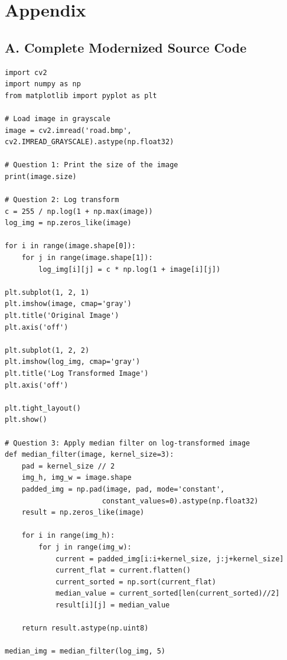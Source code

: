 \documentclass[12pt,a4paper]{article}
\begin{document}
\newpage
\section*{Appendix}

\subsection*{A. Complete Modernized Source Code}
{}

\begin{lstlisting}[caption={Complete Modernized Python Implementation}]
import cv2
import numpy as np
from matplotlib import pyplot as plt

# Load image in grayscale
image = cv2.imread('road.bmp', cv2.IMREAD_GRAYSCALE).astype(np.float32)

# Question 1: Print the size of the image
print(image.size)

# Question 2: Log transform
c = 255 / np.log(1 + np.max(image))
log_img = np.zeros_like(image)

for i in range(image.shape[0]):
    for j in range(image.shape[1]):
        log_img[i][j] = c * np.log(1 + image[i][j])

plt.subplot(1, 2, 1)
plt.imshow(image, cmap='gray')
plt.title('Original Image')
plt.axis('off')

plt.subplot(1, 2, 2)
plt.imshow(log_img, cmap='gray')
plt.title('Log Transformed Image')
plt.axis('off')

plt.tight_layout()
plt.show()

# Question 3: Apply median filter on log-transformed image
def median_filter(image, kernel_size=3):
    pad = kernel_size // 2
    img_h, img_w = image.shape
    padded_img = np.pad(image, pad, mode='constant', 
                       constant_values=0).astype(np.float32)
    result = np.zeros_like(image)
    
    for i in range(img_h):
        for j in range(img_w):
            current = padded_img[i:i+kernel_size, j:j+kernel_size]
            current_flat = current.flatten()
            current_sorted = np.sort(current_flat)
            median_value = current_sorted[len(current_sorted)//2]
            result[i][j] = median_value
    
    return result.astype(np.uint8)

median_img = median_filter(log_img, 5)


\end{lstlisting}
\end{document}
